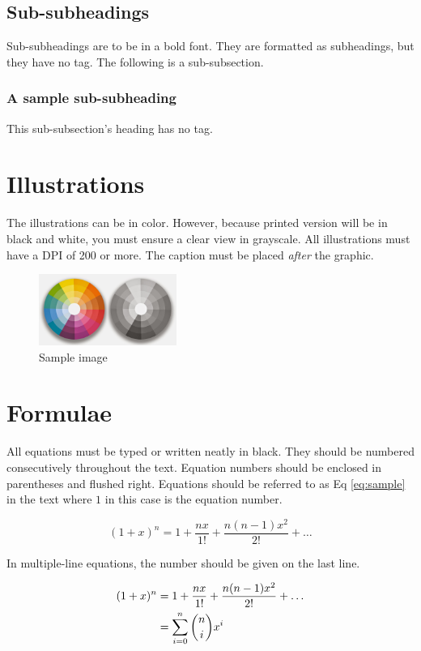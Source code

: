 \documentclass{jcst}
\begin{document}
\subsection{Sub-subheadings}
Sub-subheadings are to be in a bold font. They are formatted as subheadings,
but they have no tag. The following is a sub-subsection.

 \subsubsection{A sample sub-subheading}
 This sub-subsection's heading has no tag.

\section{Illustrations}

The illustrations can be in color. However, because printed version will be in
 black and white, you must ensure a clear view in grayscale. All illustrations
 must have a DPI of 200 or more. The caption must be placed \textit{after} the
 graphic.

\begin{figure}
\label{sample}
\centering
\includegraphics[width=0.4\textwidth]{colors}
\caption{Sample image}
\end{figure}

\section{Formulae}
All equations must be typed or written neatly in black. They should be numbered
consecutively throughout the text. Equation numbers should be enclosed in
parentheses and flushed right. Equations should be referred to as Eq \eqref{eq:sample}
in the text where $1$ in this case is the equation number.

 \begin{equation}
   \label{eq:sample}
   (1+x)^n=1+\frac{nx}{1!}+\frac{n (n-1) x^2}{2!}+\dots
 \end{equation}

 In multiple-line equations, the number should be given on the last line.

\begin{align}
\label{eq:aligned}
(1+x)^n&=1+\frac{nx}{1!}+\frac{n (n-1) x^2}{2!}+\dots \notag
      \\&=\sum_{i=0}^{n} {n\choose i} x^i
 \end{align}
\end{document}
